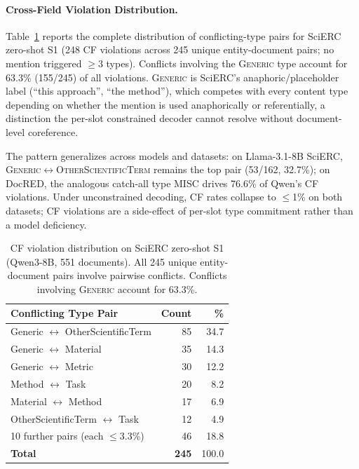
\paragraph{Cross-Field Violation Distribution.}
\label{app:cf-distribution}

Table~\ref{tab:cf-distribution} reports the complete distribution of conflicting-type pairs for SciERC zero-shot S1 (248 CF violations across 245 unique entity-document pairs; no mention triggered $\geq$3 types).
Conflicts involving the \textsc{Generic} type account for 63.3\% (155/245) of all violations.
\textsc{Generic} is SciERC's anaphoric/placeholder label (``this approach'', ``the method''), which competes with every content type depending on whether the mention is used anaphorically or referentially, a distinction the per-slot constrained decoder cannot resolve without document-level coreference.

The pattern generalizes across models and datasets: on Llama-3.1-8B SciERC, \textsc{Generic}$\leftrightarrow$\textsc{OtherScientificTerm} remains the top pair (53/162, 32.7\%); on DocRED, the analogous catch-all type \textsc{MISC} drives 76.6\% of Qwen's CF violations.
Under unconstrained decoding, CF rates collapse to $\leq$1\% on both datasets; CF violations are a side-effect of per-slot type commitment rather than a model deficiency.

\begin{table}[t]
\centering
\small
\begin{tabular}{@{}lr r@{}}
\toprule
\textbf{Conflicting Type Pair} & \textbf{Count} & \textbf{\%} \\
\midrule
Generic $\leftrightarrow$ OtherScientificTerm & 85 & 34.7 \\
Generic $\leftrightarrow$ Material & 35 & 14.3 \\
Generic $\leftrightarrow$ Metric & 30 & 12.2 \\
Method $\leftrightarrow$ Task & 20 & 8.2 \\
Material $\leftrightarrow$ Method & 17 & 6.9 \\
OtherScientificTerm $\leftrightarrow$ Task & 12 & 4.9 \\
\midrule
10 further pairs (each $\leq$3.3\%) & 46 & 18.8 \\
\midrule
\textbf{Total} & \textbf{245} & 100.0 \\
\bottomrule
\end{tabular}
\caption{CF violation distribution on SciERC zero-shot S1 (Qwen3-8B, 551 documents).
All 245 unique entity-document pairs involve pairwise conflicts.
Conflicts involving \textsc{Generic} account for 63.3\%.}
\label{tab:cf-distribution}
\end{table}

